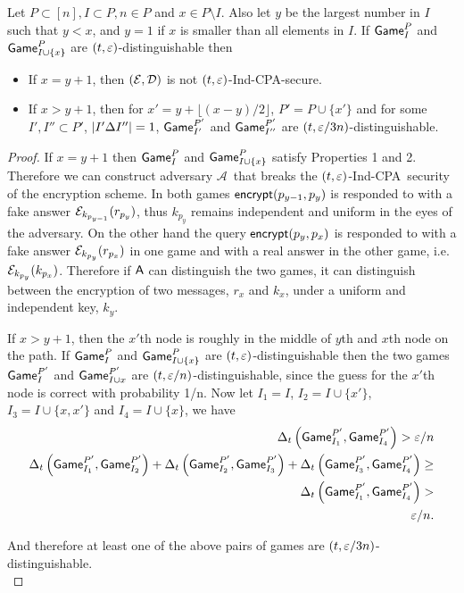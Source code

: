 \documentclass{article}
\newcommand{\tcpa}{$(t,\eps)$-Ind-CPA}
\def\A{{\sf A}}
\def\E{{\cal E}}
\def\D{{\cal D}}
\def\a {${\mathcal A}$}
\newcommand{\encrypt}{{\sf encrypt}}
\newcommand{\game}{{\sf Game}}
\newcommand{\dgg}[2]{\game_{#1}^{#2}}
\begin{document}
\begin{lemma}
Let $P\subset [n], I \subset P, n\in P$ and $x\in P\setminus I$. Also let $y$ be the largest number in $I$ such that $y < x$, and $y=1$ if  $x$ is smaller than all elements in $I$. If $\dgg{I}{P}$ and $\dgg{I\cup \{x\}}{P}$ are $(t,\varepsilon)$-distinguishable then 

\begin{itemize}
\item If $x=y+1$, then $(\E,\D)$ is not \tcpa-secure.
\item If $x>y+1$, then for $x'=y+\lfloor{(x-y)/2}\rfloor$, $P'=P\cup \{x'\}$ and for some $I', I'' \subset P'$, $\left| I'\Delta I'' \right| =1$, $\dgg{I'}{P'}$ and $\dgg{I''}{P'}$ are $(t, \varepsilon/3n)$-distinguishable.
\end{itemize}
\end{lemma}

\begin{proof}
If $x=y+1$ then $\dgg{I}{P}$ and $\dgg{I\cup \{x\}}{P}$ satisfy Properties 1 and 2. Therefore we can construct adversary \a~that breaks  the \tcpa~security of the encryption scheme. In both games $\encrypt(p_{y-1},p_{y})$ is responded to with a fake answer $\E_{k_{p_{y-1}}}(r_{p_{y}})$, thus $k_{p_{y}} $ remains independent and uniform in the eyes of the adversary. On the other hand the query $\encrypt(p_{y},p_x)$ is responded to with a fake answer $\E_{k_{p_{y}}}(r_{p_{x}})$ in one game and with a real answer in the other game, i.e. $\E_{k_{p_{y}}}(k_{p_{x}})$. Therefore if $\A$ can distinguish the two games, it can distinguish between the encryption of two messages, $r_x$ and $k_x$, under a uniform and independent key, $k_y$. 

If $x>y+1$, then the $x'$th node is roughly in the middle of $y$th and $x$th node on the path. If $\dgg{I}{P}$ and $\dgg{I\cup \{x\}}{P}$ are $(t,\varepsilon)$-distinguishable then the two games  $\dgg{I}{P'}$ and $\dgg{I\cup {x}}{P'}$ are $(t,\varepsilon/n)$-distinguishable, since the guess for the $x'$th node is correct with probability 1/n.
Now let $I_1=I$, $I_2=I\cup \{x'\}$, $I_3=I\cup \{x,x'\}$ and $I_4=I\cup \{x\}$, we have
\begin{align}
\dElta{\dgg{I_1}{P'}, \dgg{I_4}{P'}}  > \eps/n \\
\dElta{\dgg{I_1}{P'}, \dgg{I_2}{P'}} + \dElta{\dgg{I_2}{P'}, \dgg{I_3}{P'}} + \dElta{\dgg{I_3}{P'}, \dgg{I_4}{P'}}  \geq \nonumber\\ \dElta{\dgg{I_1}{P'}, \dgg{I_4}{P'}}  > \nonumber \\ \eps/n.
\end{align}

And therefore at least one of the above pairs of games are $(t,\varepsilon/3n)$-distinguishable. \\
\end{proof}
\end{document}
